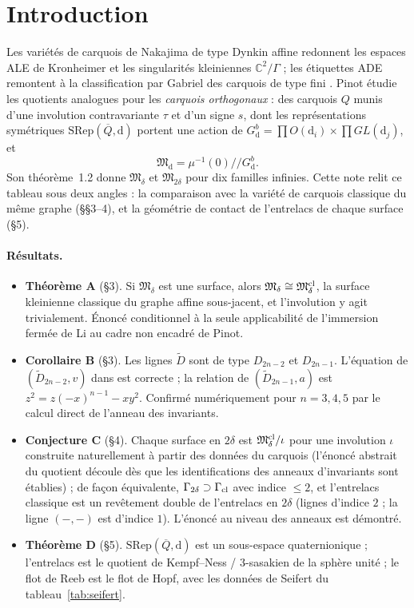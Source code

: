 \documentclass[11pt]{article}
\theoremstyle{definition}
\theoremstyle{remark}
\newcommand{\C}{\mathbb{C}}\newcommand{\R}{\mathbb{R}}\newcommand{\Z}{\mathbb{Z}}
\newcommand{\M}{\mathfrak{M}}\newcommand{\Rep}{\mathrm{Rep}}\newcommand{\SRep}{\mathrm{SRep}}
\begin{document}
\section{Introduction}

Les variétés de carquois de Nakajima de type Dynkin affine redonnent les espaces ALE de Kronheimer et les singularités kleiniennes $\C^2/\Gamma$ \cite{Kro89,Nak94} ; les étiquettes ADE remontent à la classification par Gabriel des carquois de type fini \cite{Gab72}. Pinot étudie les quotients analogues pour les \emph{carquois orthogonaux} \cite{Pin26} : des carquois $Q$ munis d'une involution contravariante $\tau$ et d'un signe $s$, dont les représentations symétriques $\SRep(\overline Q,\mathrm d)$ portent une action de $G^b_{\mathrm d}=\prod O(\mathrm d_i)\times\prod GL(\mathrm d_j)$, et
\[\M_{\mathrm d}=\mu^{-1}(0)/\!/G^b_{\mathrm d}.\]
Son théorème~1.2 donne $\M_\delta$ et $\M_{2\delta}$ pour dix familles infinies. Cette note relit ce tableau sous deux angles : la comparaison avec la variété de carquois classique du même graphe (\S\S3--4), et la géométrie de contact de l'entrelacs de chaque surface (\S5).

\paragraph{Résultats.}
\begin{itemize}[leftmargin=*]
\item \textbf{Théorème A} (\S3). Si $\M_\delta$ est une surface, alors $\M_\delta\cong\M_\delta^{\rm cl}$, la surface kleinienne classique du graphe affine sous-jacent, et l'involution y agit trivialement. Énoncé conditionnel à la seule applicabilité de l'immersion fermée de Li au cadre non encadré de Pinot.
\item \textbf{Corollaire B} (\S3). Les lignes $\widetilde D$ sont de type $D_{2n-2}$ et $D_{2n-1}$. L'équation de $(\widetilde D_{2n-2},v)$ dans \cite{Pin26} est correcte ; la relation de $(\widetilde D_{2n-1},a)$ est $z^2=z(-x)^{n-1}-xy^2$. Confirmé numériquement pour $n=3,4,5$ par le calcul direct de l'anneau des invariants.
\item \textbf{Conjecture C} (\S4). Chaque surface en $2\delta$ est $\M^{\rm cl}_\delta/\iota$ pour une involution $\iota$ construite naturellement à partir des données du carquois (l'énoncé abstrait du quotient découle dès que les identifications des anneaux d'invariants sont établies) ; de façon équivalente, $\Gamma_{2\delta}\supset\Gamma_{\rm cl}$ avec indice $\le2$, et l'entrelacs classique est un revêtement double de l'entrelacs en $2\delta$ (lignes d'indice $2$ ; la ligne $(-,-)$ est d'indice $1$). L'énoncé au niveau des anneaux est démontré.
\item \textbf{Théorème D} (\S5). $\SRep(\overline Q,\mathrm d)$ est un sous-espace quaternionique ; l'entrelacs est le quotient de Kempf--Ness / $3$-sasakien de la sphère unité ; le flot de Reeb est le flot de Hopf, avec les données de Seifert du tableau~\ref{tab:seifert}.
\end{itemize}
\end{document}
